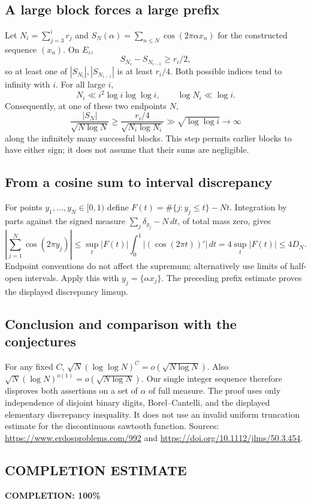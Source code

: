 \subsection*{A large block forces a large prefix}
Let $N_i=\sum_{j=3}^{i}r_j$ and
$S_N(\alpha)=\sum_{n\le N}\cos(2\pi\alpha x_n)$ for the constructed sequence $(x_n)$.
On $E_i$,
\[
 S_{N_i}-S_{N_{i-1}}\ge r_i/2,
\]
so at least one of $|S_{N_i}|,|S_{N_{i-1}}|$ is at least $r_i/4$.
Both possible indices tend to infinity with $i$. For all large $i$,
\[
 N_i\ll i^2\log i\log\log i,\qquad \log N_i\ll\log i.
\]
Consequently, at one of these two endpoints $N$,
\[
 \frac{|S_N|}{\sqrt{N\log N}}
 \ge\frac{r_i/4}{\sqrt{N_i\log N_i}}
 \gg\sqrt{\log\log i}\longrightarrow\infty
\]
along the infinitely many successful blocks.
This step permits earlier blocks to have either sign; it does not assume that their sums are negligible.

\subsection*{From a cosine sum to interval discrepancy}
For points $y_1,\ldots,y_N\in[0,1)$ define
$F(t)=\#\{j:y_j\le t\}-Nt$.
Integration by parts against the signed measure $\sum_j\delta_{y_j}-N\,dt$, of total mass zero, gives
\[
 \left|\sum_{j=1}^{N}\cos(2\pi y_j)\right|
 \le\sup_t|F(t)|\int_0^1|(\cos(2\pi t))'|\,dt
 =4\sup_t|F(t)|\le4D_N.
\]
Endpoint conventions do not affect the supremum; alternatively use limits of half-open intervals.
Apply this with $y_j=\{\alpha x_j\}$. The preceding prefix estimate proves the displayed discrepancy limsup.

\subsection*{Conclusion and comparison with the conjectures}
For any fixed $C$, $\sqrt{N}(\log\log N)^C=o(\sqrt{N\log N})$.
Also $\sqrt{N}(\log N)^{o(1)}=o(\sqrt{N\log N})$. Our single integer sequence therefore disproves both assertions on a set of $\alpha$ of full measure.
The proof uses only independence of disjoint binary digits, Borel--Cantelli, and the displayed elementary discrepancy inequality. It does not use an invalid uniform truncation estimate for the discontinuous sawtooth function.
Sources: \url{https://www.erdosproblems.com/992} and \url{https://doi.org/10.1112/jlms/50.3.454}.
\subsection*{COMPLETION ESTIMATE}
\textbf{COMPLETION: 100\%}
